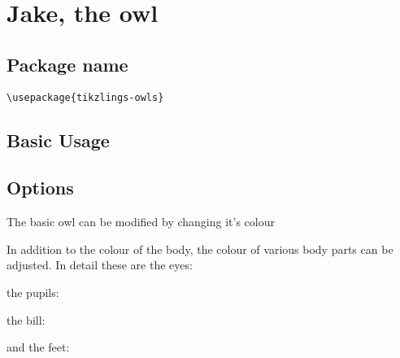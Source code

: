 \documentclass[parskip=half]{scrartcl}
\begin{document}
\clearpage
\section[\textbackslash owl]{Jake, the owl}

\subsection{Package name}

\begin{tcolorbox}[lower separated=false, lefthand width=.8\linewidth]
\vspace*{0.5cm}
\lstinline|\usepackage{tikzlings-owls}|
\vspace*{0.5cm}
\end{tcolorbox}

\subsection{Basic Usage}

\begin{tcblisting}{}
\owl
\end{tcblisting}

\subsection{Options}

The basic owl can be modified by changing it's colour

\begin{tcblisting}{}
\owl[body=SteelBlue]
\end{tcblisting}

In addition to the colour of the body, the colour of various body parts can be adjusted. In detail these are the eyes:

\begin{tcblisting}{}
\owl[eye=red]
\end{tcblisting}

the pupils:

\begin{tcblisting}{}
\owl[pupil=red]
\end{tcblisting}

the bill:

\begin{tcblisting}{}
\owl[bill=red]
\end{tcblisting}

and the feet:

\begin{tcblisting}{}
\owl[feet=red]
\end{tcblisting}
\end{document}

